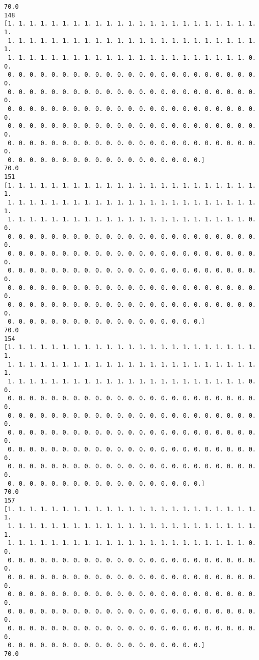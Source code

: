 \documentclass[11pt]{article}
\begin{document}
\begin{Verbatim}[commandchars=\\\{\}]
70.0
148
[1. 1. 1. 1. 1. 1. 1. 1. 1. 1. 1. 1. 1. 1. 1. 1. 1. 1. 1. 1. 1. 1. 1. 1.
 1. 1. 1. 1. 1. 1. 1. 1. 1. 1. 1. 1. 1. 1. 1. 1. 1. 1. 1. 1. 1. 1. 1. 1.
 1. 1. 1. 1. 1. 1. 1. 1. 1. 1. 1. 1. 1. 1. 1. 1. 1. 1. 1. 1. 1. 1. 0. 0.
 0. 0. 0. 0. 0. 0. 0. 0. 0. 0. 0. 0. 0. 0. 0. 0. 0. 0. 0. 0. 0. 0. 0. 0.
 0. 0. 0. 0. 0. 0. 0. 0. 0. 0. 0. 0. 0. 0. 0. 0. 0. 0. 0. 0. 0. 0. 0. 0.
 0. 0. 0. 0. 0. 0. 0. 0. 0. 0. 0. 0. 0. 0. 0. 0. 0. 0. 0. 0. 0. 0. 0. 0.
 0. 0. 0. 0. 0. 0. 0. 0. 0. 0. 0. 0. 0. 0. 0. 0. 0. 0. 0. 0. 0. 0. 0. 0.
 0. 0. 0. 0. 0. 0. 0. 0. 0. 0. 0. 0. 0. 0. 0. 0. 0. 0. 0. 0. 0. 0. 0. 0.
 0. 0. 0. 0. 0. 0. 0. 0. 0. 0. 0. 0. 0. 0. 0. 0. 0. 0.]
70.0
151
[1. 1. 1. 1. 1. 1. 1. 1. 1. 1. 1. 1. 1. 1. 1. 1. 1. 1. 1. 1. 1. 1. 1. 1.
 1. 1. 1. 1. 1. 1. 1. 1. 1. 1. 1. 1. 1. 1. 1. 1. 1. 1. 1. 1. 1. 1. 1. 1.
 1. 1. 1. 1. 1. 1. 1. 1. 1. 1. 1. 1. 1. 1. 1. 1. 1. 1. 1. 1. 1. 1. 0. 0.
 0. 0. 0. 0. 0. 0. 0. 0. 0. 0. 0. 0. 0. 0. 0. 0. 0. 0. 0. 0. 0. 0. 0. 0.
 0. 0. 0. 0. 0. 0. 0. 0. 0. 0. 0. 0. 0. 0. 0. 0. 0. 0. 0. 0. 0. 0. 0. 0.
 0. 0. 0. 0. 0. 0. 0. 0. 0. 0. 0. 0. 0. 0. 0. 0. 0. 0. 0. 0. 0. 0. 0. 0.
 0. 0. 0. 0. 0. 0. 0. 0. 0. 0. 0. 0. 0. 0. 0. 0. 0. 0. 0. 0. 0. 0. 0. 0.
 0. 0. 0. 0. 0. 0. 0. 0. 0. 0. 0. 0. 0. 0. 0. 0. 0. 0. 0. 0. 0. 0. 0. 0.
 0. 0. 0. 0. 0. 0. 0. 0. 0. 0. 0. 0. 0. 0. 0. 0. 0. 0.]
70.0
154
[1. 1. 1. 1. 1. 1. 1. 1. 1. 1. 1. 1. 1. 1. 1. 1. 1. 1. 1. 1. 1. 1. 1. 1.
 1. 1. 1. 1. 1. 1. 1. 1. 1. 1. 1. 1. 1. 1. 1. 1. 1. 1. 1. 1. 1. 1. 1. 1.
 1. 1. 1. 1. 1. 1. 1. 1. 1. 1. 1. 1. 1. 1. 1. 1. 1. 1. 1. 1. 1. 1. 0. 0.
 0. 0. 0. 0. 0. 0. 0. 0. 0. 0. 0. 0. 0. 0. 0. 0. 0. 0. 0. 0. 0. 0. 0. 0.
 0. 0. 0. 0. 0. 0. 0. 0. 0. 0. 0. 0. 0. 0. 0. 0. 0. 0. 0. 0. 0. 0. 0. 0.
 0. 0. 0. 0. 0. 0. 0. 0. 0. 0. 0. 0. 0. 0. 0. 0. 0. 0. 0. 0. 0. 0. 0. 0.
 0. 0. 0. 0. 0. 0. 0. 0. 0. 0. 0. 0. 0. 0. 0. 0. 0. 0. 0. 0. 0. 0. 0. 0.
 0. 0. 0. 0. 0. 0. 0. 0. 0. 0. 0. 0. 0. 0. 0. 0. 0. 0. 0. 0. 0. 0. 0. 0.
 0. 0. 0. 0. 0. 0. 0. 0. 0. 0. 0. 0. 0. 0. 0. 0. 0. 0.]
70.0
157
[1. 1. 1. 1. 1. 1. 1. 1. 1. 1. 1. 1. 1. 1. 1. 1. 1. 1. 1. 1. 1. 1. 1. 1.
 1. 1. 1. 1. 1. 1. 1. 1. 1. 1. 1. 1. 1. 1. 1. 1. 1. 1. 1. 1. 1. 1. 1. 1.
 1. 1. 1. 1. 1. 1. 1. 1. 1. 1. 1. 1. 1. 1. 1. 1. 1. 1. 1. 1. 1. 1. 0. 0.
 0. 0. 0. 0. 0. 0. 0. 0. 0. 0. 0. 0. 0. 0. 0. 0. 0. 0. 0. 0. 0. 0. 0. 0.
 0. 0. 0. 0. 0. 0. 0. 0. 0. 0. 0. 0. 0. 0. 0. 0. 0. 0. 0. 0. 0. 0. 0. 0.
 0. 0. 0. 0. 0. 0. 0. 0. 0. 0. 0. 0. 0. 0. 0. 0. 0. 0. 0. 0. 0. 0. 0. 0.
 0. 0. 0. 0. 0. 0. 0. 0. 0. 0. 0. 0. 0. 0. 0. 0. 0. 0. 0. 0. 0. 0. 0. 0.
 0. 0. 0. 0. 0. 0. 0. 0. 0. 0. 0. 0. 0. 0. 0. 0. 0. 0. 0. 0. 0. 0. 0. 0.
 0. 0. 0. 0. 0. 0. 0. 0. 0. 0. 0. 0. 0. 0. 0. 0. 0. 0.]
70.0

\end{Verbatim}
\end{document}
